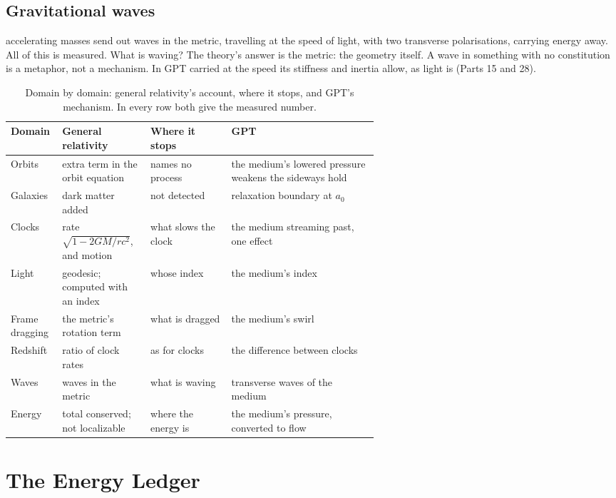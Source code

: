 \subsection{Gravitational waves}

 accelerating masses send out waves in the metric, travelling at the speed of light, with two transverse polarisations, carrying energy away. All of this is measured. What is waving? The theory's answer is the metric: the geometry itself. A wave in something with no constitution is a metaphor, not a mechanism. In GPT  carried at the speed its stiffness and inertia allow, as light is (Parts 15 and 28).

\begin{table}[t]\centering\small
\caption{Domain by domain: general relativity's account, where it stops, and GPT's mechanism. In every row both give the measured number.}
\begin{tabularx}{\linewidth}{@{}>{\raggedright}p{0.14\linewidth} >{\raggedright}p{0.24\linewidth} >{\raggedright}p{0.22\linewidth} X@{}}\toprule
\textbf{Domain} & \textbf{General relativity} & \textbf{Where it stops} & \textbf{GPT}\\\midrule
Orbits & extra term in the orbit equation & names no process & the medium's lowered pressure weakens the sideways hold\\
Galaxies & dark matter added & not detected & relaxation boundary at $a_0$\\
Clocks & rate $\sqrt{1-2GM/rc^2}$, and motion & what slows the clock & the medium streaming past, one effect\\
Light & geodesic; computed with an index & whose index & the medium's index\\
Frame dragging & the metric's rotation term & what is dragged & the medium's swirl\\
Redshift & ratio of clock rates & as for clocks & the difference between clocks\\
Waves & waves in the metric & what is waving & transverse waves of the medium\\
Energy & total conserved; not localizable & where the energy is & the medium's pressure, converted to flow\\\bottomrule
\end{tabularx}\label{tab:domains}\end{table}

\section{The Energy Ledger}

